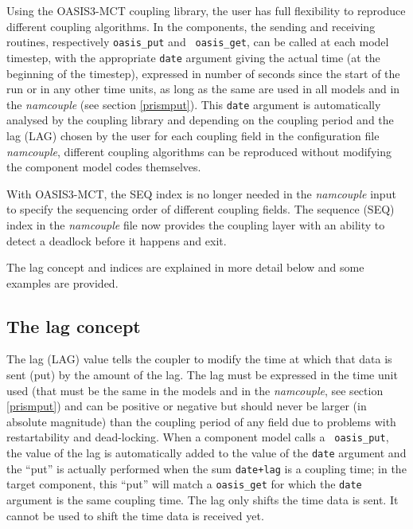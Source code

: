 Using the OASIS3-MCT coupling library, the user has full flexibility
to reproduce different coupling algorithms. In the components, the
sending and receiving routines, respectively {\tt oasis\_put} and {\tt
  oasis\_get}, can be called at each model timestep, with the
appropriate {\tt date} argument giving the actual time (at the
beginning of the timestep), expressed in number of seconds since the
start of the run or in any other time units, as long as the same are
used in all models and in the {\it namcouple} (see section
\ref{prismput}). This {\tt date} argument is automatically analysed by
the coupling library and depending on the coupling period and the lag
(LAG) chosen by the user for each coupling field in the configuration
file {\it namcouple}, different coupling algorithms can be reproduced
without modifying the component model codes themselves.

With OASIS3-MCT, the SEQ index is no longer needed in the {\it
  namcouple} input to specify the sequencing order of different
coupling fields.  The sequence (SEQ) index in the {\it namcouple} file
now provides the coupling layer with an ability to detect a deadlock
before it happens and exit.

The lag concept and indices are explained in more detail below and
some examples are provided.

\vspace{-0.3cm}
\subsection{The lag concept}
\label{subsub_lag}

The lag (LAG) value tells the coupler to modify the time at which that
data is sent (put) by the amount of the lag.  The lag must be
expressed in the time unit used (that must be the same in the models
and in the {\it namcouple}, see section \ref{prismput}) and can be
positive or negative but should never be larger (in absolute
magnitude) than the coupling period of any field due to problems with
restartability and dead-locking. When a component model calls a {\tt
  oasis\_put}, the value of the lag is automatically added to the
value of the {\tt date} argument and the ``put'' is actually performed
when the sum {\tt date+lag} is a coupling time; in the target
component, this ``put'' will match a {\tt oasis\_get} for which the
{\tt date} argument is the same coupling time.
The lag only shifts the time data is sent.  It cannot be used to shift
the time data is received yet.
 
